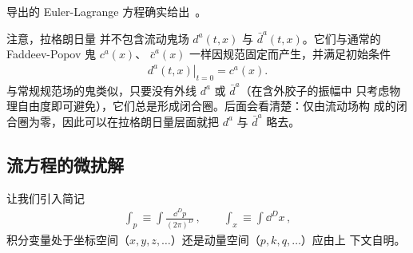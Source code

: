 导出的 Euler-Lagrange 方程确实给出 \,\cite{Luscher:2011bx}。

注意，拉格朗日量  并不包含流动鬼场
$d^a(t,x)$ 与 $\bar{d}^a(t,x)$。它们与通常的 Faddeev-Popov 鬼 $c^a(x)$、
$\bar{c}^a(x)$ 一样因规范固定而产生，并满足初始条件
\begin{align}
  \left. d^a (t,x) \right|_{t=0} = c^a(x).
\end{align}
与常规规范场的鬼类似，只要没有外线 $d^a$ 或 $\bar{d}^a$（在含外胶子的振幅中
只考虑物理自由度即可避免），它们总是形成闭合圈。后面会看清楚：仅由流动场构
成的闭合圈为零，因此可以在拉格朗日量层面就把 $d^a$ 与 $\bar{d}^a$ 略去。


\subsection{流方程的微扰解}

让我们引入简记
\begin{equation}
  \begin{split}
    \int_p \equiv \int\frac{\dd^D p}{(2\pi)^D}\,,\qquad
    \int_x \equiv \int\dd^D x\,,
  \end{split}
\end{equation}
积分变量处于坐标空间（$x,y,z,\ldots$）还是动量空间（$p,k,q,\ldots$）应由上
下文自明。

